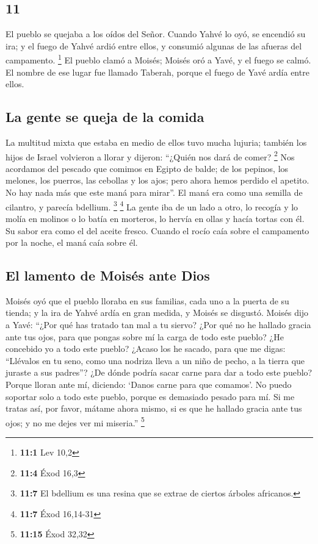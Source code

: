 \begin{paracol}{2}
\hypertarget{section-20}{%
\section{11}\label{section-20}}

 El pueblo se quejaba a los oídos del Señor. Cuando Yahvé
lo oyó, se encendió su ira; y el fuego de Yahvé ardió entre ellos, y
consumió algunas de las afueras del campamento. \footnote{\textbf{11:1}
  Lev 10,2}  El pueblo clamó a Moisés; Moisés oró a Yavé,
y el fuego se calmó.  El nombre de ese lugar fue llamado
Taberah, porque el fuego de Yavé ardía entre ellos.

\hypertarget{la-gente-se-queja-de-la-comida}{%
\subsection{La gente se queja de la
comida}\label{la-gente-se-queja-de-la-comida}}

 La multitud mixta que estaba en medio de ellos tuvo mucha
lujuria; también los hijos de Israel volvieron a llorar y dijeron:
``¿Quién nos dará de comer? \footnote{\textbf{11:4} Éxod 16,3}
 Nos acordamos del pescado que comimos en Egipto de balde;
de los pepinos, los melones, los puerros, las cebollas y los ajos;
 pero ahora hemos perdido el apetito. No hay nada más que
este maná para mirar''.  El maná era como una semilla de
cilantro, y parecía bdellium. \footnote{\textbf{11:7} El bdellium es una
  resina que se extrae de ciertos árboles africanos.} \footnote{\textbf{11:7}
  Éxod 16,14-31}  La gente iba de un lado a otro, lo
recogía y lo molía en molinos o lo batía en morteros, lo hervía en ollas
y hacía tortas con él. Su sabor era como el del aceite fresco.
 Cuando el rocío caía sobre el campamento por la noche, el
maná caía sobre él.

\hypertarget{el-lamento-de-moisuxe9s-ante-dios}{%
\subsection{El lamento de Moisés ante
Dios}\label{el-lamento-de-moisuxe9s-ante-dios}}

 Moisés oyó que el pueblo lloraba en sus familias, cada
uno a la puerta de su tienda; y la ira de Yahvé ardía en gran medida, y
Moisés se disgustó.  Moisés dijo a Yavé: ``¿Por qué has
tratado tan mal a tu siervo? ¿Por qué no he hallado gracia ante tus
ojos, para que pongas sobre mí la carga de todo este pueblo?
 ¿He concebido yo a todo este pueblo? ¿Acaso los he
sacado, para que me digas: ``Llévalos en tu seno, como una nodriza lleva
a un niño de pecho, a la tierra que juraste a sus padres''?
 ¿De dónde podría sacar carne para dar a todo este
pueblo? Porque lloran ante mí, diciendo: `Danos carne para que comamos'.
 No puedo soportar solo a todo este pueblo, porque es
demasiado pesado para mí.  Si me tratas así, por favor,
mátame ahora mismo, si es que he hallado gracia ante tus ojos; y no me
dejes ver mi miseria.'' \footnote{\textbf{11:15} Éxod 32,32}


\end{paracol}
